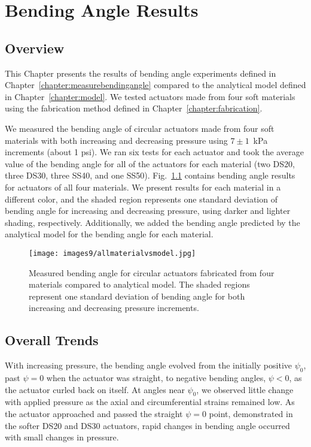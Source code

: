 \chapter{Bending Angle Results}
\label{chapter:angleresults}

\section{Overview}
This Chapter presents the results of bending angle experiments defined in Chapter~\ref{chapter:measurebendingangle} compared to the analytical model defined in Chapter~\ref{chapter:model}. We tested actuators made from four soft materials using the fabrication method defined in Chapter~\ref{chapter:fabrication}.

We measured the bending angle of circular actuators made from four soft materials with both increasing and decreasing pressure using $7\pm1$~kPa increments (about 1 psi). We ran six tests for each actuator and took the average value of the bending angle for all of the actuators for each material (two DS20, three DS30, three SS40, and one SS50). Fig.~\ref{fig:allmaterialvsmodel} contains bending angle results for actuators of all four materials. We present results for each material in a different color, and the shaded region represents one standard deviation of bending angle for increasing and decreasing pressure, using darker and lighter shading, respectively. Additionally, we added the bending angle predicted by the analytical model for the bending angle for each material.

\begin{figure}[ht]
    \centering
     \texttt{[image: images9/allmaterialvsmodel.jpg]}
    \caption{Measured bending angle for circular actuators fabricated from four materials compared to analytical model. The shaded regions represent one standard deviation of bending angle for both increasing and decreasing pressure increments.}
    \label{fig:allmaterialvsmodel}
\end{figure}

\section{Overall Trends}

With increasing pressure, the bending angle evolved from the initially positive $\psi_0$, past $\psi=0$ when the actuator was straight, to negative bending angles, $\psi<0$, as the actuator curled back on itself. At angles near $\psi_0$, we observed little change with applied pressure as the axial and circumferential strains remained low. As the actuator approached and passed the straight $\psi=0$ point, demonstrated in the softer DS20 and DS30 actuators, rapid changes in bending angle occurred with small changes in pressure. 

